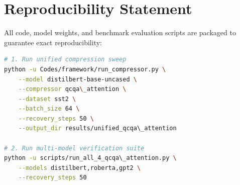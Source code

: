\section{Reproducibility Statement}
All code, model weights, and benchmark evaluation scripts are packaged to guarantee exact reproducibility:
\begin{lstlisting}[language=bash]
# 1. Run unified compression sweep
python -u Codes/framework/run_compressor.py \
    --model distilbert-base-uncased \
    --compressor qcqa\_attention \
    --dataset sst2 \
    --batch_size 64 \
    --recovery_steps 50 \
    --output_dir results/unified_qcqa\_attention

# 2. Run multi-model verification suite
python -u scripts/run_all_4_qcqa\_attention.py \
    --models distilbert,roberta,gpt2 \
    --recovery_steps 50
\end{lstlisting}
